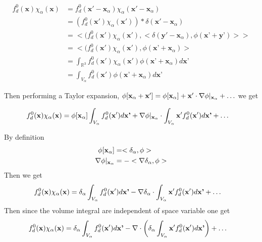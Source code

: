 \begin{align}
f^0_d(\mathbf{x}) \chi_\alpha (\mathbf{x}) &= f^0_d(\textbf{x} ' - \textbf{x}_\alpha) \chi_\alpha (\textbf{x} ' - \textbf{x}_\alpha) \\
                               &= (f^0_d(\textbf{x}') \chi_\alpha (\textbf{x}'))*\delta(\textbf{x} ' - \textbf{x}_\alpha)\\
                               &=<   (f^0_d(\textbf{x}') \chi_\alpha(\textbf{x}'),< \delta(\textbf{y} '-\textbf{x}_\alpha),\phi(\textbf{x'}+\textbf{y'})>>\\
                               &= <   (f^0_d(\textbf{x}') \chi_\alpha(\textbf{x}'), \phi(\textbf{x'}+\textbf{x}_\alpha)> \\
                               &= \int_{\mathbb{R}^3} f^0_d(\textbf{x}') \chi_\alpha(\textbf{x}')\phi(\textbf{x'}+\textbf{x}_\alpha)d\textbf{x'} \\
                               &= \int_{V_\alpha} f^0_d(\textbf{x}')\phi(\textbf{x'}+\textbf{x}_\alpha)d\textbf{x'}
\end{align}


Then performing a Taylor expansion, $\phi[\textbf{x}_\alpha +\textbf{x}'] = \phi[\textbf{x}_\alpha] + \textbf{x}' \cdot \mathbf{\nabla} \phi|_{\textbf{x}_\alpha} + \ldots$ we get

\begin{align}
    f^0_d(\mathbf{x}) \chi_\alpha (\mathbf{x}) &= \phi[\textbf{x}_\alpha]\int_{V_\alpha} f^0_d(\textbf{x}')d\textbf{x'} +   \mathbf{\nabla} \phi|_{\textbf{x}_\alpha}\cdot\int_{V_\alpha} \textbf{x}'f^0_d(\textbf{x}')d\textbf{x'}+\ldots
\end{align}

By definition
\begin{align*}
    \phi[\textbf{x}_\alpha]&
    =  <\delta_\alpha, \phi>
    \\
    \mathbf{\nabla}\phi|_{\textbf{x}_\alpha}
    &= 
     -<
    \mathbf{\nabla}\delta_\alpha,
    \phi
    >
\end{align*}
Then we get 
\begin{align}
    f^0_d(\mathbf{x}) \chi_\alpha (\mathbf{x}) &= \delta_\alpha\int_{V_\alpha} f^0_d(\textbf{x}')d\textbf{x'} -   \mathbf{\nabla}\delta_\alpha\cdot\int_{V_\alpha} \textbf{x}'f^0_d(\textbf{x}')d\textbf{x'}+\ldots
\end{align}
Then since the volume integral are independent of space variable one get
\begin{align}
    f^0_d(\mathbf{x}) \chi_\alpha (\mathbf{x}) &= \delta_\alpha\int_{V_\alpha} f^0_d(\textbf{x}')d\textbf{x'} -   \mathbf{\nabla} \cdot \left(\delta_\alpha\int_{V_\alpha} \textbf{x}'f^0_d(\textbf{x}')d\textbf{x'}\right)+\ldots
\end{align}